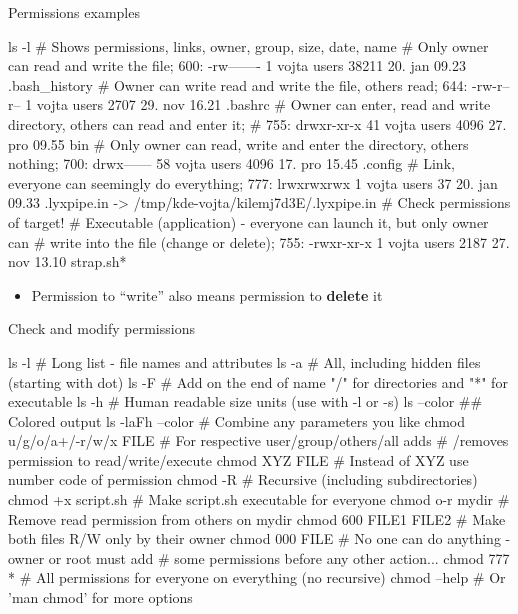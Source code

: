 \documentclass[compress, xelatex, 11pt, xcolor=svgnames, aspectratio=169,
	hyperref={
		bookmarks=true,
		unicode=true,
		colorlinks=true,
		pdftitle={Linux, command line and MetaCentrum},
		plainpages=false,
		pdfauthor={Vojtech Zeisek},
		pdfsubject={Course about use of Linux command line, writing shell scripts and using MetaCentrum of CESNET},
		pdfcreator={XeLaTeX},
		pdfkeywords={Linux, GNU, BASH, shell, command line, MetaCentrum},
		linkcolor=DarkRed, %
		anchorcolor=DarkBlue, %
		citecolor=Indigo, %
		filecolor=NavyBlue, %
		menucolor=DarkMagenta, %
		urlcolor=DarkBlue, %
		},
	url={hyphens, lowtilde} %
	]{beamer}
\begin{document}
\begin{frame}[fragile]{Permissions examples}
	\begin{bashcode}
    ls -l # Shows permissions, links, owner, group, size, date, name
    # Only owner can read and write the file; 600:
    -rw-------   1 vojta users   38211 20. jan 09.23 .bash_history
    # Owner can write read and write the file, others read; 644:
    -rw-r--r--   1 vojta users    2707 29. nov 16.21 .bashrc
    # Owner can enter, read and write directory, others can read and enter it;
    # 755:
    drwxr-xr-x  41 vojta users    4096 27. pro 09.55 bin
    # Only owner can read, write and enter the directory, others nothing; 700:
    drwx------  58 vojta users    4096 17. pro 15.45 .config
    # Link, everyone can seemingly do everything; 777:
    lrwxrwxrwx   1 vojta users      37 20. jan 09.33 .lyxpipe.in ->
      /tmp/kde-vojta/kilemj7d3E/.lyxpipe.in # Check permissions of target!
    # Executable (application) - everyone can launch it, but only owner can
    # write into the file (change or delete); 755:
    -rwxr-xr-x   1 vojta users    2187 27. nov 13.10 strap.sh*
	\end{bashcode}
	\vfill
	\begin{itemize}
		\item Permission to \enquote{write} also means permission to \textbf{delete} it
	\end{itemize}
\end{frame}

\begin{frame}[fragile]{Check and modify permissions}
	\begin{bashcode}
    ls -l # Long list - file names and attributes
    ls -a # All, including hidden files (starting with dot)
    ls -F # Add on the end of name "/" for directories and "*" for executable
    ls -h # Human readable size units (use with -l or -s)
    ls --color ## Colored output
    ls -laFh --color # Combine any parameters you like
    chmod u/g/o/a+/-r/w/x FILE # For respective user/group/others/all adds
                               # /removes permission to read/write/execute
    chmod XYZ FILE # Instead of XYZ use number code of permission
    chmod -R # Recursive (including subdirectories)
    chmod +x script.sh # Make script.sh executable for everyone
    chmod o-r mydir # Remove read permission from others on mydir
    chmod 600 FILE1 FILE2 # Make both files R/W only by their owner
    chmod 000 FILE # No one can do anything - owner or root must add
                   # some permissions before any other action...
    chmod 777 * # All permissions for everyone on everything (no recursive)
    chmod --help # Or 'man chmod' for more options
	\end{bashcode}
\end{frame}
\end{document}
